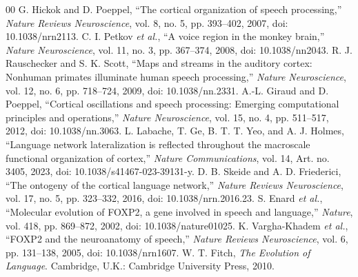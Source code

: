 \documentclass[conference]{IEEEtran}
\begin{document}
\begin{thebibliography}{00}
 G. Hickok and D. Poeppel, ``The cortical organization of speech processing,'' \emph{Nature Reviews Neuroscience}, vol. 8, no. 5, pp. 393--402, 2007, doi: 10.1038/nrn2113.
 C. I. Petkov \emph{et al.}, ``A voice region in the monkey brain,'' \emph{Nature Neuroscience}, vol. 11, no. 3, pp. 367--374, 2008, doi: 10.1038/nn2043.
 R. J. Rauschecker and S. K. Scott, ``Maps and streams in the auditory cortex: Nonhuman primates illuminate human speech processing,'' \emph{Nature Neuroscience}, vol. 12, no. 6, pp. 718--724, 2009, doi: 10.1038/nn.2331.
 A.-L. Giraud and D. Poeppel, ``Cortical oscillations and speech processing: Emerging computational principles and operations,'' \emph{Nature Neuroscience}, vol. 15, no. 4, pp. 511--517, 2012, doi: 10.1038/nn.3063.
 L. Labache, T. Ge, B. T. T. Yeo, and A. J. Holmes, ``Language network lateralization is reflected throughout the macroscale functional organization of cortex,'' \emph{Nature Communications}, vol. 14, Art. no. 3405, 2023, doi: 10.1038/s41467-023-39131-y.
 D. B. Skeide and A. D. Friederici, ``The ontogeny of the cortical language network,'' \emph{Nature Reviews Neuroscience}, vol. 17, no. 5, pp. 323--332, 2016, doi: 10.1038/nrn.2016.23.
 S. Enard \emph{et al.}, ``Molecular evolution of FOXP2, a gene involved in speech and language,'' \emph{Nature}, vol. 418, pp. 869--872, 2002, doi: 10.1038/nature01025.
 K. Vargha-Khadem \emph{et al.}, ``FOXP2 and the neuroanatomy of speech,'' \emph{Nature Reviews Neuroscience}, vol. 6, pp. 131--138, 2005, doi: 10.1038/nrn1607.
 W. T. Fitch, \emph{The Evolution of Language}. Cambridge, U.K.: Cambridge University Press, 2010.
\end{thebibliography}
\end{document}
